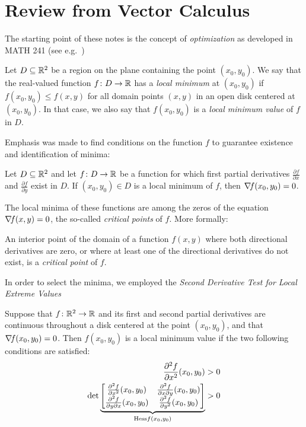 
\chapter{Review from Vector Calculus}

The starting point of these notes is the concept of \emph{optimization} as developed in MATH 241 (see e.g.~\cite[Chapter~14]{finney2001thomas})

\begin{definition}\label{def:localminimum}
Let $D\subseteq \mathbb{R}^2$ be a region on the plane containing the point $(x_0, y_0)$.  We say that the real-valued function $f\colon D \to \mathbb{R}$ has a \emph{local minimum} at $(x_0,y_0)$ if $f(x_0,y_0) \leq f(x,y)$ for all domain points $(x,y)$ in an open disk centered at $(x_0,y_0)$.  In that case, we also say that $f(x_0,y_0)$ is a \emph{local minimum value} of $f$ in $D$.
\end{definition}

Emphasis was made to find conditions on the function $f$ to guarantee existence and identification of minima:

\begin{theorem}\label{theorem:localminimum}
Let $D \subseteq \mathbb{R}^2$ and let $f \colon D \to \mathbb{R}$ be a function for which first partial derivatives $\frac{\partial f}{\partial x}$ and $\frac{\partial f}{\partial y}$ exist in $D$.  If $(x_0,y_0) \in D$ is a local minimum of $f$, then $\mathop{\nabla\! {f}}(x_0,y_0)=0$.
\end{theorem}

The local minima of these functions are among the zeros of the equation $\mathop{\nabla\! {f}}(x,y)=0$, the so-called \emph{critical points} of $f$. More formally:

\begin{definition}\label{def:criticalpoint}
An interior point of the domain of a function $f(x,y)$ where both directional derivatives are zero, or where at least one of the directional derivatives do not exist, is a \emph{critical point} of $f$.
\end{definition}

In order to select the minima, we employed the \emph{Second Derivative Test for Local Extreme Values}
\begin{theorem}\label{theorem:2DTforLEV}
Suppose that $f\colon \mathbb{R}^2 \to \mathbb{R}$ and its first and second partial derivatives are continuous throughout a disk centered at the point $(x_0,y_0)$, and that $\mathop{\nabla\! {f}}(x_0,y_0)=0$. Then $f(x_0,y_0)$ is a local minimum value if the two following conditions are satisfied:
\begin{align}
\frac{\partial^2 f}{\partial x^2}(x_0,y_0) &> 0 \\
\det \underbrace{\begin{bmatrix} 
\frac{\partial^2 f}{\partial x^2}(x_0,y_0) & \frac{\partial^2 f}{\partial x \partial y}(x_0,y_0) \\
\frac{\partial^2 f}{\partial y \partial x}(x_0,y_0) & \frac{\partial^2 f}{\partial y^2}(x_0,y_0)
\end{bmatrix}}_{\mathop{\mathrm{Hess}{f}}(x_0,y_0)} &> 0
\end{align}
\end{theorem}

